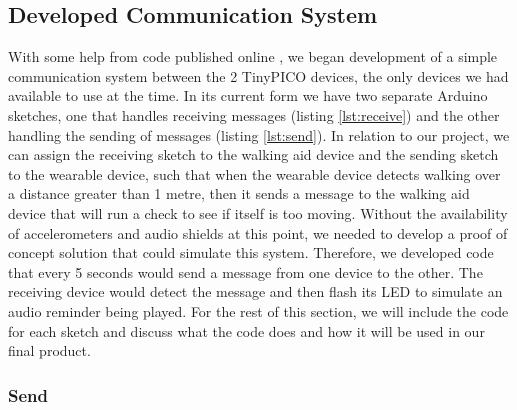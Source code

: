 {\subsection{Developed Communication System}

With some help from code published online \cite{random_nerd_tutorials}, we began development of a simple communication system between the 2 TinyPICO devices, the only devices we had available to use at the time. In its current form we have two separate Arduino sketches, one that handles receiving messages (listing \ref{lst:receive}) and the other handling the sending of messages (listing \ref{lst:send}). In relation to our project, we can assign the receiving sketch to the walking aid device and the sending sketch to the wearable device, such that when the wearable device detects walking over a distance greater than 1 metre, then it sends a message to the walking aid device that will run a check to see if itself is too moving. Without the availability of accelerometers and audio shields at this point, we needed to develop a proof of concept solution that could simulate this system. Therefore, we developed code that every 5 seconds would send a message from one device to the other. The receiving device would detect the message and then flash its LED to simulate an audio reminder being played. For the rest of this section, we will include the code for each sketch and discuss what the code does and how it will be used in our final product.

\subsubsection{Send}



}

